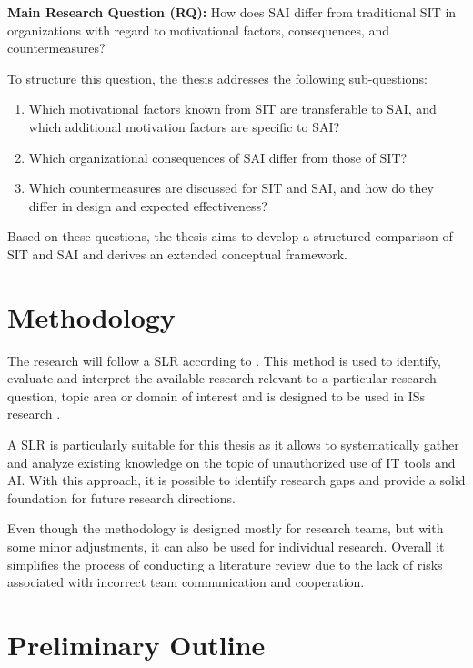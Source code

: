 \documentclass[12pt,oneside]{article}
\begin{document}
\textbf{Main Research Question (RQ):}  
How does \ac{SAI} differ from traditional \ac{SIT} in organizations with regard to motivational factors, consequences, and countermeasures?

To structure this question, the thesis addresses the following sub-questions:

\begin{enumerate}
  \item Which motivational factors known from \ac{SIT} are transferable to \ac{SAI}, and which additional motivation factors are specific to \ac{SAI}?
  \item Which organizational consequences of \ac{SAI} differ from those of \ac{SIT}?
  \item Which countermeasures are discussed for \ac{SIT} and \ac{SAI}, and how do they differ in design and expected effectiveness?
\end{enumerate}

Based on these questions, the thesis aims to develop a structured comparison of \ac{SIT} and \ac{SAI} and derives an extended conceptual framework.

\section{Methodology} \label{methodology}

The research will follow a \ac{SLR} according to \citet{RN1}. This method is used to identify, evaluate and interpret the available research relevant to a particular research question, topic area or domain of interest and is designed to be used in \acp{IS} research \citep[884]{RN1}.

A \ac{SLR} is particularly suitable for this thesis as it allows to systematically gather and analyze existing knowledge on the topic of unauthorized use of \ac{IT} tools and \ac{AI}. With this approach, it is possible to identify research gaps and provide a solid foundation for future research directions. 

Even though the methodology is designed mostly for research teams, but with some minor adjustments, it can also be used for individual research. Overall it simplifies the process of conducting a literature review due to the lack of risks associated with incorrect team communication and cooperation.

\section{Preliminary Outline}
\end{document}
